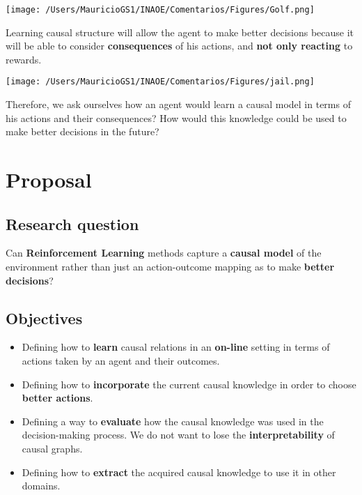 \documentclass[a0,portrait]{a0poster}
\begin{document}
\begin{multicols}{3}
\begin{center}
\texttt{[image: /Users/MauricioGS1/INAOE/Comentarios/Figures/Golf.png]}
\end{center}
Learning causal structure will allow the agent to make better decisions because it will be able to consider \textbf{consequences} of his actions, and \textbf{not only reacting} to rewards.\\
\begin{center}
\texttt{[image: /Users/MauricioGS1/INAOE/Comentarios/Figures/jail.png]}
\end{center}
Therefore, we ask ourselves how an agent would learn a causal model in terms of his actions and their consequences? How would this knowledge could be used to make better decisions in the future?
\color{SaddleBrown} %
\section*{Proposal}
\subsection*{Research question}
Can \textbf{Reinforcement Learning} methods capture a \textbf{causal model} of the environment rather than just an action-outcome mapping as to make \textbf{better decisions}?
\subsection*{Objectives}
\begin{itemize}
\item Defining how to \textbf{learn} causal relations in an \textbf{on-line} setting in terms of actions taken by an agent and their outcomes.
\item Defining how to \textbf{incorporate} the current causal knowledge in order to choose \textbf{better actions}.
\item Defining a way to \textbf{evaluate} how the causal knowledge was used in the decision-making process. We do not want to lose the \textbf{interpretability} of causal graphs.
\item Defining how to \textbf{extract} the acquired causal knowledge to use it in other domains.
\end{itemize}

\end{multicols}
\end{document}
